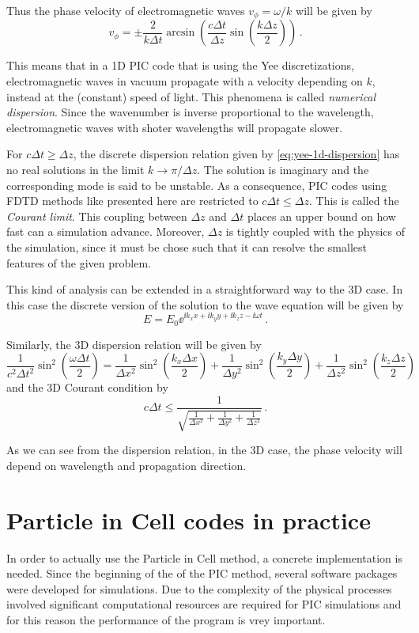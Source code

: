 \documentclass[12pt, class=report, crop=false]{standalone}
\begin{document}
Thus the phase velocity of electromagnetic waves \(v_\phi = \omega/k\) will be given by
\[
v_\phi = \pm \frac{2}{k\Delta t} \arcsin(\frac{c \Delta t}{\Delta z} \sin(\frac{k \Delta z}{2}))\,.
\]

This means that in a 1D PIC code that is using the Yee discretizations, electromagnetic
waves in vacuum propagate with a velocity depending on \(k\), instead at the
(constant) speed of light. This phenomena is called \emph{numerical dispersion}.
Since the wavenumber is inverse proportional to the wavelength, electromagnetic
waves with shoter wavelengths will propagate slower.

For \(c \Delta t \ge \Delta z\), the discrete dispersion relation given by
\cref{eq:yee-1d-dispersion} has no real solutions in the limit \(k \to \pi/\Delta z\).
The solution is imaginary and the corresponding mode is said to be unstable.
As a consequence, PIC codes using FDTD methods like presented here are restricted
to \(c \Delta t \leq \Delta z\). This is called the \emph{Courant limit}.
This coupling between \(\Delta z\) and \(\Delta t\) places an upper bound on
how fast can a simulation advance.
Moreover, \(\Delta z\) is tightly coupled with the physics of the simulation,
since it must be chose such that it can resolve the smallest features of
the given problem.

This kind of analysis can be extended in a straightforward way to the 3D case.
In this case the discrete version of the solution to the wave equation will
be given by
\[
E = E_0 \ee^{\ii k_x x + \ii k_y y + \ii k_z z - \ii \omega t}\,.
\]

Similarly, the 3D dispersion relation will be given by
\[
\frac{1}{c^2 \Delta t^2} \sin^2\left(\frac{\omega \Delta t}{2}\right) =
  \frac{1}{\Delta x^2} \sin^2\left(\frac{k_x \Delta x}{2}\right) +
  \frac{1}{\Delta y^2} \sin^2\left(\frac{k_y \Delta y}{2}\right) +
  \frac{1}{\Delta z^2} \sin^2\left(\frac{k_z \Delta z}{2}\right)
\]
and the 3D Courant condition by
\[
c \Delta t \leq \frac{1}{\sqrt{\frac{1}{\Delta x^2} + \frac{1}{\Delta y^2} + \frac{1}{\Delta z^2}}}\,.
\]

As we can see from the dispersion relation, in the 3D case, the phase velocity
will depend on wavelength and propagation direction.

\section{Particle in Cell codes in practice}

In order to actually use the Particle in Cell method, a concrete implementation
is needed. Since the beginning of the of the PIC method, several software packages
were developed for simulations. Due to the complexity of the physical processes
involved significant computational resources are required for PIC simulations
and for this reason the performance of the program is vrey important.
\end{document}
